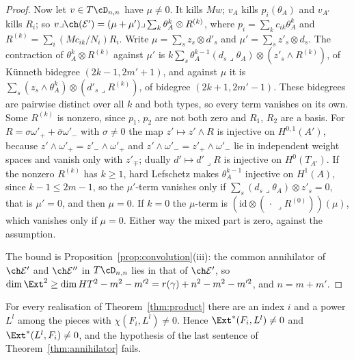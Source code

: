 \begin{proof}
Now let $v\in T\cD_{n,n}$ have $\mu\ne0$. It kills $Mw$; $v_{A}$ kills $p_{i}(\theta_{A})$ and $v_{A'}$ kills $R_{i}$; so $v\lrcorner\ch(\mathcal{E}')=(\mu+\mu')\lrcorner\sum_{k}\theta_{A}^{k}\otimes R^{(k)}$, where $p_{i}=\sum_{k}c_{ik}\theta_{A}^{k}$ and $R^{(k)}=\sum_{i}(Mc_{ik}/N_{i})R_{i}$. Write $\mu=\sum_{s}z_{s}\otimes d'_{s}$ and $\mu'=\sum_{s}z'_{s}\otimes d_{s}$. The contraction of $\theta_{A}^{k}\otimes R^{(k)}$ against $\mu'$ is $k\sum_{s}\theta_{A}^{k-1}(d_{s}\lrcorner\theta_{A})\otimes(z'_{s}\wedge R^{(k)})$, of K\"unneth bidegree $(2k-1,2m'+1)$, and against $\mu$ it is $\sum_{s}(z_{s}\wedge\theta_{A}^{k})\otimes(d'_{s}\lrcorner R^{(k)})$, of bidegree $(2k+1,2m'-1)$. These bidegrees are pairwise distinct over all $k$ and both types, so every term vanishes on its own. Some $R^{(k)}$ is nonzero, since $p_{1}$, $p_{2}$ are not both zero and $R_{1}$, $R_{2}$ are a basis. For $R=\sigma\omega'_{+}+\bar\sigma\omega'_{-}$ with $\sigma\ne0$ the map $z'\mapsto z'\wedge R$ is injective on $H^{0,1}(A')$, because $z'\wedge\omega'_{+}=z'_{-}\wedge\omega'_{+}$ and $z'\wedge\omega'_{-}=z'_{+}\wedge\omega'_{-}$ lie in independent weight spaces and vanish only with $z'_{\mp}$; dually $d'\mapsto d'\lrcorner R$ is injective on $H^{0}(T_{A'})$. If the nonzero $R^{(k)}$ has $k\ge1$, hard Lefschetz makes $\theta_{A}^{k-1}$ injective on $H^{1}(A)$, since $k-1\le2m-1$, so the $\mu'$-term vanishes only if $\sum_{s}(d_{s}\lrcorner\theta_{A})\otimes z'_{s}=0$, that is $\mu'=0$, and then $\mu=0$. If $k=0$ the $\mu$-term is $(\mathrm{id}\otimes(\,\cdot\,\lrcorner R^{(0)}))(\mu)$, which vanishes only if $\mu=0$. Either way the mixed part is zero, against the assumption.

The bound is Proposition~\ref{prop:convolution}(iii): the common annihilator of $\ch\mathcal{E}'$ and $\ch\mathcal{E}''$ in $T\cD_{n,n}$ lies in that of $\ch\mathcal{E}'$, so $\dim\Ext^{2}\ge\dim HT^{2}-m^{2}-m'^{2}=r(\gamma)+n^{2}-m^{2}-m'^{2}$, and $n=m+m'$.
\end{proof}

\begin{proposition}\label{prop:noorth}
For every realisation of Theorem~\ref{thm:product} there are an index $i$ and a power $L^{l}$ among the pieces with $\chi(F_{i},L^{l})\ne0$. Hence $\Ext^{*}(F_{i},L^{l})\ne0$ and $\Ext^{*}(L^{l},F_{i})\ne0$, and the hypothesis of the last sentence of Theorem~\ref{thm:annihilator} fails.
\end{proposition}

